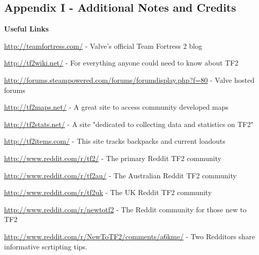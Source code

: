 \subsection{Appendix I - Additional Notes and Credits}
\newenvironment{packed_item}{
\begin{itemize}
  \setlength{\itemsep}{1pt}
  \setlength{\parskip}{0pt}
  \setlength{\parsep}{0pt}
}{\end{itemize}}


{\bf Useful Links}

\url{http://teamfortress.com/} - Valve's official Team Fortress 2 blog

\url{http://tf2wiki.net/} - For everything anyone could need to know about TF2

\url{http://forums.steampowered.com/forums/forumdisplay.php?f=80} - Valve hosted forums 

\url{http://tf2maps.net/} - A great site to access community developed maps

\url{http://tf2stats.net/} - A site "dedicated to collecting data and statistics on TF2"

\url{http://tf2items.com/} - This site tracks backpacks and current loadouts

\url{http://www.reddit.com/r/tf2/} - The primary Reddit TF2 community

\url{http://www.reddit.com/r/tf2au/} - The Australian Reddit TF2 community

\url{http://www.reddit.com/r/tf2uk} - The UK Reddit TF2 community

\url{http://www.reddit.com/r/newtotf2} - The Reddit community for those new to TF2

\url{http://www.reddit.com/r/NewToTF2/comments/a6kme/} - Two Redditors share informative scrtipting tips.

